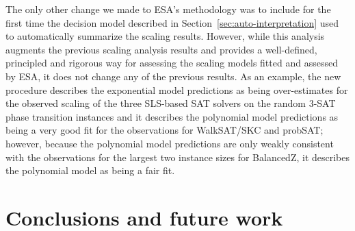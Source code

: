 \documentclass[aic]{iosart2x}
\begin{document}
The only other change we made to ESA's methodology was to include for the first time the decision model described in Section~\ref{sec:auto-interpretation} used to automatically summarize the scaling results. 
However, while this analysis augments the previous scaling analysis results and provides a well-defined, principled and rigorous way for assessing the scaling models fitted and assessed by ESA, it does not change any of the previous results. As an example, the new procedure describes the exponential model predictions as being over-estimates for the observed scaling of the three SLS-based SAT solvers on the random 3-SAT phase transition instances and it describes the polynomial model predictions as being a very good fit for the observations for WalkSAT/SKC and probSAT; however, because the polynomial model predictions are only weakly consistent with the observations for the largest two instance sizes for BalancedZ, it describes the polynomial model as being a fair fit. 


\section{Conclusions and future work}
\label{sec:Conclusion}
\end{document}
